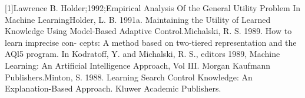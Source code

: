 \documentclass[extendedabs]{bmvc2k}
\begin{document}
[1]Lawrence B. Holder;1992;Empirical Analysis Of the General Utility Problem In Machine Learning\newline
[2]Holder, L. B. 1991a. Maintaining the Utility of Learned Knowledge Using Model-Based Adaptive Control.\newline
[3]Michalski, R. S. 1989. How to learn imprecise con- cepts: A method based on two-tiered representation and the AQl5 program. In Kodratoff, Y. and Michalski, R. S., editors 1989, Machine Learning: An Artificial Intelligence Approach, Vol III. Morgan Kaufmann Publishers.\newline
[4]Minton, S. 1988. Learning Search Control Knowledge: An Explanation-Based Approach. Kluwer Academic Publishers.
\end{document}
